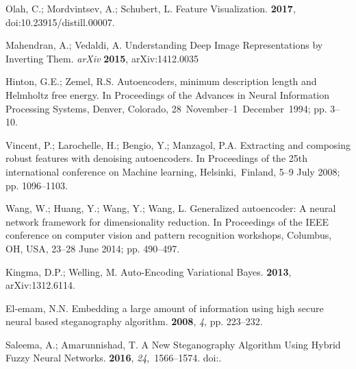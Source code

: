 \documentclass[futureinternet,article,accept,moreauthors,pdftex,10pt,a4paper]{Definitions/mdpi}
\begin{document}
\begin{thebibliography}{999}
Olah, C.; Mordvintsev, A.; Schubert, L.
\newblock Feature Visualization.
 {\bf 2017},
\newblock doi:{10.23915/distill.00007}.

Mahendran, A.; Vedaldi, A.
\newblock Understanding Deep Image Representations by Inverting Them.  \emph{arXiv} \textbf{2015}, arXiv:1412.0035

Hinton, G.E.; Zemel, R.S.
\newblock Autoencoders, minimum description length and Helmholtz free energy.
\newblock  In {Proceedings of the Advances in Neural Information Processing Systems}, Denver, Colorado, \mbox{28 November--1 December 1994}; pp. 3--10.

Vincent, P.; Larochelle, H.; Bengio, Y.; Manzagol, P.A.
\newblock Extracting and composing robust features with denoising autoencoders.
\newblock  In Proceedings of the 25th international conference on Machine
  learning,  Helsinki,~Finland,  5--9 July 2008; pp. 1096--1103.


Wang, W.; Huang, Y.; Wang, Y.; Wang, L.
\newblock Generalized autoencoder: A neural network framework for
  dimensionality reduction.
\newblock  In Proceedings of the IEEE conference on computer vision and pattern
  recognition workshops,  Columbus, OH, USA,  23--28 June 2014; pp. 490--497.


Kingma, D.P.; Welling, M.
\newblock Auto-Encoding Variational Bayes.
 {\bf 2013},
\newblock arXiv:1312.6114.

El-emam, N.N.
\newblock Embedding a large amount of information using high secure neural
  based steganography algorithm.
 {\bf 2008}, {\em 4}, pp. 223--232.

Saleema, A.; Amarunnishad, T.
\newblock A New Steganography Algorithm Using Hybrid Fuzzy Neural Networks.
 {\bf 2016}, {\em 24},~1566–1574.
\newblock
  doi:{\href{https://doi.org/10.1016/j.protcy.2016.05.139}{}}.


\end{thebibliography}
\end{document}

